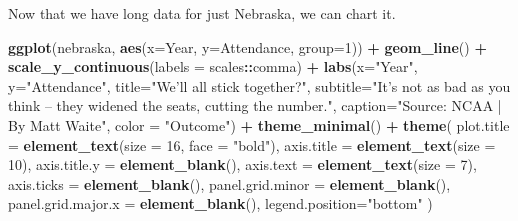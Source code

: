 \documentclass[]{book}
\newenvironment{Shaded}{\begin{snugshade}}{\end{snugshade}}
\newcommand{\DataTypeTok}[1]{\textcolor[rgb]{0.13,0.29,0.53}{#1}}
\newcommand{\DecValTok}[1]{\textcolor[rgb]{0.00,0.00,0.81}{#1}}
\newcommand{\KeywordTok}[1]{\textcolor[rgb]{0.13,0.29,0.53}{\textbf{#1}}}
\newcommand{\NormalTok}[1]{#1}
\newcommand{\OperatorTok}[1]{\textcolor[rgb]{0.81,0.36,0.00}{\textbf{#1}}}
\newcommand{\StringTok}[1]{\textcolor[rgb]{0.31,0.60,0.02}{#1}}
\begin{document}
\begin{Shaded}
\end{Shaded}

Now that we have long data for just Nebraska, we can chart it.

\begin{Shaded}
\begin{Highlighting}[]
\KeywordTok{ggplot}\NormalTok{(nebraska, }\KeywordTok{aes}\NormalTok{(}\DataTypeTok{x=}\NormalTok{Year, }\DataTypeTok{y=}\NormalTok{Attendance, }\DataTypeTok{group=}\DecValTok{1}\NormalTok{)) }\OperatorTok{+}\StringTok{ }
\StringTok{  }\KeywordTok{geom_line}\NormalTok{() }\OperatorTok{+}\StringTok{ }
\StringTok{  }\KeywordTok{scale_y_continuous}\NormalTok{(}\DataTypeTok{labels =}\NormalTok{ scales}\OperatorTok{::}\NormalTok{comma) }\OperatorTok{+}\StringTok{ }
\StringTok{  }\KeywordTok{labs}\NormalTok{(}\DataTypeTok{x=}\StringTok{"Year"}\NormalTok{, }\DataTypeTok{y=}\StringTok{"Attendance"}\NormalTok{, }\DataTypeTok{title=}\StringTok{"We'll all stick together?"}\NormalTok{, }\DataTypeTok{subtitle=}\StringTok{"It's not as bad as you think -- they widened the seats, cutting the number."}\NormalTok{, }\DataTypeTok{caption=}\StringTok{"Source: NCAA | By Matt Waite"}\NormalTok{, }\DataTypeTok{color =} \StringTok{"Outcome"}\NormalTok{) }\OperatorTok{+}
\StringTok{  }\KeywordTok{theme_minimal}\NormalTok{() }\OperatorTok{+}\StringTok{ }
\StringTok{  }\KeywordTok{theme}\NormalTok{(}
    \DataTypeTok{plot.title =} \KeywordTok{element_text}\NormalTok{(}\DataTypeTok{size =} \DecValTok{16}\NormalTok{, }\DataTypeTok{face =} \StringTok{"bold"}\NormalTok{),}
    \DataTypeTok{axis.title =} \KeywordTok{element_text}\NormalTok{(}\DataTypeTok{size =} \DecValTok{10}\NormalTok{),}
    \DataTypeTok{axis.title.y =} \KeywordTok{element_blank}\NormalTok{(),}
    \DataTypeTok{axis.text =} \KeywordTok{element_text}\NormalTok{(}\DataTypeTok{size =} \DecValTok{7}\NormalTok{),}
    \DataTypeTok{axis.ticks =} \KeywordTok{element_blank}\NormalTok{(),}
    \DataTypeTok{panel.grid.minor =} \KeywordTok{element_blank}\NormalTok{(),}
    \DataTypeTok{panel.grid.major.x =} \KeywordTok{element_blank}\NormalTok{(),}
    \DataTypeTok{legend.position=}\StringTok{"bottom"}
\NormalTok{  )}
\end{Highlighting}
\end{Shaded}
\end{document}
